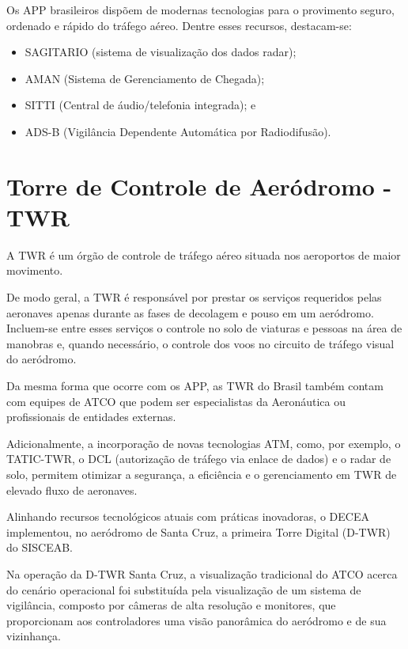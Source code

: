\documentclass[
]{book}
\providecommand{\tightlist}{%
  \setlength{\itemsep}{0pt}\setlength{\parskip}{0pt}}
\begin{document}
Os APP brasileiros dispõem de modernas tecnologias para o provimento seguro, ordenado e rápido do tráfego aéreo. Dentre esses recursos, destacam-se:

\begin{itemize}
\tightlist
\item
  SAGITARIO (sistema de visualização dos dados radar);
\item
  AMAN (Sistema de Gerenciamento de Chegada);
\item
  SITTI (Central de áudio/telefonia integrada); e
\item
  ADS-B (Vigilância Dependente Automática por Radiodifusão).
\end{itemize}

\hypertarget{torre-de-controle-de-aeruxf3dromo---twr}{%
\section{Torre de Controle de Aeródromo - TWR}\label{torre-de-controle-de-aeruxf3dromo---twr}}

A TWR é um órgão de controle de tráfego aéreo situada nos aeroportos de maior movimento.

De modo geral, a TWR é responsável por prestar os serviços requeridos pelas aeronaves apenas durante as fases de decolagem e pouso em um aeródromo. Incluem-se entre esses serviços o controle no solo de viaturas e pessoas na área de manobras e, quando necessário, o controle dos voos no circuito de tráfego visual do aeródromo.

Da mesma forma que ocorre com os APP, as TWR do Brasil também contam com equipes de ATCO que podem ser especialistas da Aeronáutica ou profissionais de entidades externas.

Adicionalmente, a incorporação de novas tecnologias ATM, como, por exemplo, o TATIC-TWR, o DCL (autorização de tráfego via enlace de dados) e o radar de solo, permitem otimizar a segurança, a eficiência e o gerenciamento em TWR de elevado fluxo de aeronaves.

Alinhando recursos tecnológicos atuais com práticas inovadoras, o DECEA implementou, no aeródromo de Santa Cruz, a primeira Torre Digital (D-TWR) do SISCEAB.

Na operação da D-TWR Santa Cruz, a visualização tradicional do ATCO acerca do cenário operacional foi substituída pela visualização de um sistema de vigilância, composto por câmeras de alta resolução e monitores, que proporcionam aos controladores uma visão panorâmica do aeródromo e de sua vizinhança.
\end{document}

